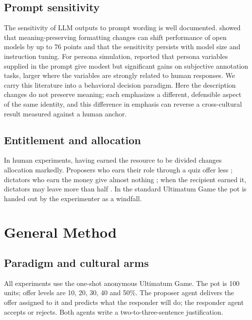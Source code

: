 \documentclass[11pt]{article}
\begin{document}
\subsection{Prompt sensitivity}

The sensitivity of LLM outputs to prompt wording is well documented. \citet{sclar2024quantifying} showed that meaning-preserving formatting changes can shift performance of open models by up to 76 points and that the sensitivity persists with model size and instruction tuning. For persona simulation, \citet{hu2024persona} reported that persona variables supplied in the prompt give modest but significant gains on subjective annotation tasks, larger where the variables are strongly related to human responses. We carry this literature into a behavioral decision paradigm. Here the description changes do not preserve meaning; each emphasizes a different, defensible aspect of the same identity, and this difference in emphasis can reverse a cross-cultural result measured against a human anchor.

\subsection{Entitlement and allocation}

In human experiments, having earned the resource to be divided changes allocation markedly. Proposers who earn their role through a quiz offer less \citep{hoffman1994}; dictators who earn the money give almost nothing \citep{cherry2002}; when the recipient earned it, dictators may leave more than half \citep{oxoby2008}. In the standard Ultimatum Game the pot is handed out by the experimenter as a windfall.


\section{General Method}

\subsection{Paradigm and cultural arms}

All experiments use the one-shot anonymous Ultimatum Game. The pot is 100 units; offer levels are 10, 20, 30, 40 and 50\%. The proposer agent delivers the offer assigned to it and predicts what the responder will do; the responder agent accepts or rejects. Both agents write a two-to-three-sentence justification.
\end{document}
